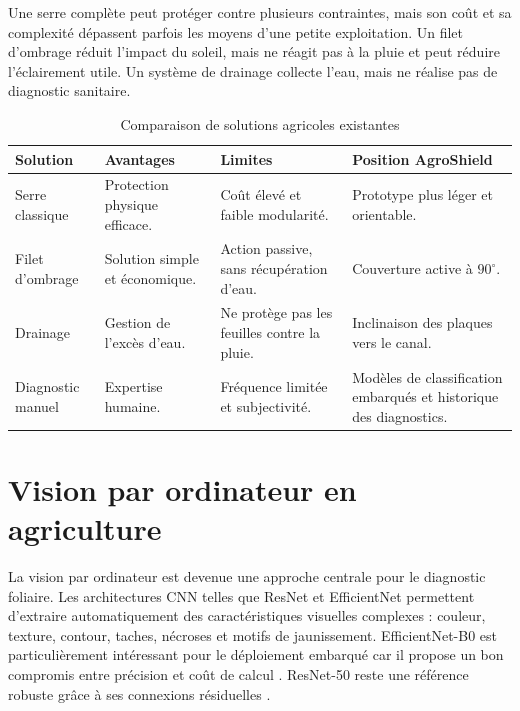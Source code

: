 ﻿\documentclass[11pt,a4paper,openany]{report}
\begin{document}
Une serre complète peut protéger contre plusieurs contraintes, mais son coût et sa complexité dépassent parfois les moyens d'une petite exploitation. Un filet d'ombrage réduit l'impact du soleil, mais ne réagit pas à la pluie et peut réduire l'éclairement utile. Un système de drainage collecte l'eau, mais ne réalise pas de diagnostic sanitaire.

\begin{table}[H]
\centering
\small
\renewcommand{\arraystretch}{1.3}

\begin{tabular}{|p{3cm}|p{3.2cm}|p{3.2cm}|p{4cm}|}
\hline
\textbf{Solution} &
\textbf{Avantages} &
\textbf{Limites} &
\textbf{Position AgroShield} \\
\hline

Serre classique &
Protection physique efficace. &
Coût élevé et faible modularité. &
Prototype plus léger et orientable. \\
\hline

Filet d'ombrage &
Solution simple et économique. &
Action passive, sans récupération d'eau. &
Couverture active à $90^\circ$. \\
\hline

Drainage &
Gestion de l'excès d'eau. &
Ne protège pas les feuilles contre la pluie. &
Inclinaison des plaques vers le canal. \\
\hline

Diagnostic manuel &
Expertise humaine. &
Fréquence limitée et subjectivité. &
Modèles de classification embarqués et historique des diagnostics. \\
\hline

\end{tabular}

\caption{Comparaison de solutions agricoles existantes}
\label{tab:solutions_existantes}
\end{table}

\section{Vision par ordinateur en agriculture}
La vision par ordinateur est devenue une approche centrale pour le diagnostic foliaire. Les architectures CNN telles que ResNet et EfficientNet permettent d'extraire automatiquement des caractéristiques visuelles complexes : couleur, texture, contour, taches, nécroses et motifs de jaunissement. EfficientNet-B0 est particulièrement intéressant pour le déploiement embarqué car il propose un bon compromis entre précision et coût de calcul \cite{efficientnet}. ResNet-50 reste une référence robuste grâce à ses connexions résiduelles \cite{resnet}.
\end{document}
